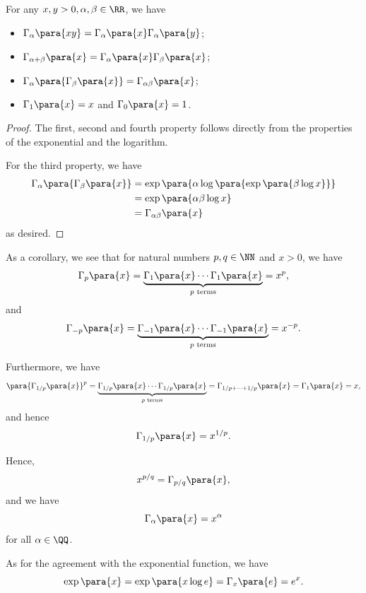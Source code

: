 \begin{lemma}
    \label{lem:properties-power}%
    For any \(x, y > 0, \alpha, \beta \in \RR\), we have
    \begin{itemize}
        \item \(\Gamma_\alpha \para{xy} = \Gamma_\alpha \para{x} \Gamma_\alpha \para{y}\);
        \item \(\Gamma_{\alpha + \beta} \para{x} = \Gamma_\alpha \para{x} \Gamma_\beta \para{x}\);
        \item \(\Gamma_\alpha \para{\Gamma_\beta \para{x}} = \Gamma_{\alpha \beta} \para{x}\);
        \item \(\Gamma_1\para{x} = x\) and \(\Gamma_0 \para{x} = 1\).
    \end{itemize}
\end{lemma}

\begin{proof}
    The first, second and fourth property follows directly from the properties of the exponential and the logarithm.

    For the third property, we have
    \begin{align*}
        \Gamma_\alpha \para{\Gamma_\beta \para{x}} &= \exp\para{\alpha \log\para{\exp \para{\beta \log x}}} \\
        &= \exp\para{\alpha \beta \log x} \\
        &= \Gamma_{\alpha \beta} \para{x}
    \end{align*}
    as desired.
\end{proof}

As a corollary, we see that for natural numbers \(p, q \in \NN\) and \(x > 0\), we have
\[
    \Gamma_p \para{x} = \underbrace{\Gamma_1 \para{x} \cdots \Gamma_1 \para{x}}_{p \text{ terms}} = x^p,
\]
and
\[
    \Gamma_{-p} \para{x} = \underbrace{\Gamma_{-1} \para{x} \cdots \Gamma_{-1} \para{x}}_{p \text{ terms}} = x^{-p}.
\]

Furthermore, we have
\[
    \para{\Gamma_{1 / p} \para{x}}^{p} = \underbrace{\Gamma_{1 / p} \para{x} \cdots \Gamma_{1 / p} \para{x}}_{p \text{ terms}} = \Gamma_{1 / p + \cdots + 1 / p} \para{x} = \Gamma_1 \para{x} = x,
\]
and hence
\[
    \Gamma_{1 / p} \para{x} = x^{1 / p}.
\]

Hence,
\[
    x^{p / q} = \Gamma_{p / q} \para{x},
\]
and we have
\[
    \Gamma_{\alpha} \para{x} = x^\alpha
\]
for all \(\alpha \in \QQ\).

As for the agreement with the exponential function, we have
\[
    \exp\para{x} = \exp\para{x \log e} = \Gamma_x \para{e} = e^x.
\]

